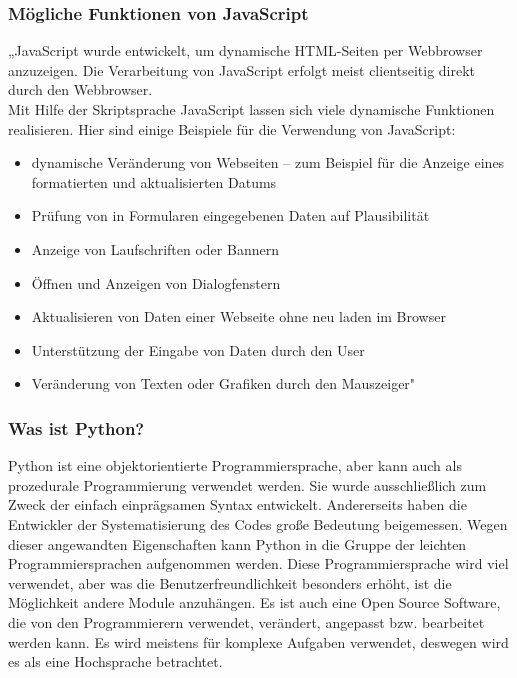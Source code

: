 \subsubsection{Mögliche Funktionen von JavaScript} 
„JavaScript wurde entwickelt, um dynamische HTML-Seiten per Webbrowser anzuzeigen. Die Verarbeitung von JavaScript erfolgt meist clientseitig direkt durch den Webbrowser. \\
Mit Hilfe der Skriptsprache JavaScript lassen sich viele dynamische Funktionen realisieren. Hier sind einige Beispiele für die Verwendung von JavaScript:
\begin{itemize}
	\item  dynamische Veränderung von Webseiten – zum Beispiel für die Anzeige eines formatierten und aktualisierten Datums
\end{itemize}
\begin{itemize}
	\item Prüfung von in Formularen eingegebenen Daten auf Plausibilität
\end{itemize}
\begin{itemize}
	\item Anzeige von Laufschriften oder Bannern
\end{itemize}
\begin{itemize}
	\item 	Öffnen und Anzeigen von Dialogfenstern
\end{itemize}
\begin{itemize}
	\item Aktualisieren von Daten einer Webseite ohne neu laden im Browser
\end{itemize}
\begin{itemize}
	\item 	Unterstützung der Eingabe von Daten durch den User
\end{itemize}
\begin{itemize}
	\item Veränderung von Texten oder Grafiken durch den Mauszeiger" \cite{50_javascript}
\end{itemize}
\subsubsection{Was ist Python?} 
Python ist eine objektorientierte Programmiersprache, aber kann auch als prozedurale Programmierung verwendet werden. Sie wurde ausschließlich zum Zweck der einfach einprägsamen Syntax entwickelt. Andererseits haben die Entwickler der Systematisierung des Codes große Bedeutung beigemessen. Wegen dieser angewandten Eigenschaften kann Python in die Gruppe der leichten Programmiersprachen aufgenommen werden. Diese Programmiersprache wird viel verwendet, aber was die Benutzerfreundlichkeit besonders erhöht, ist die Möglichkeit andere Module anzuhängen. Es ist auch eine Open Source Software, die von den Programmierern verwendet, verändert, angepasst bzw. bearbeitet werden kann. Es wird meistens für komplexe Aufgaben verwendet, deswegen wird es als eine Hochsprache betrachtet. \cite{50_python}
